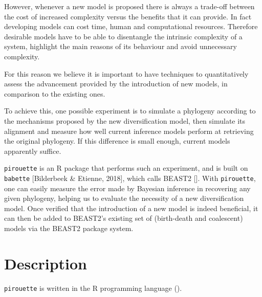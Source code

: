 \documentclass{article}
\begin{document}
However, whenever a new model is proposed there is always a trade-off 
between the cost of increased complexity versus the benefits that it can provide.
In fact developing models can cost time, human and computational resources.
Therefore desirable models have to be able to disentangle 
the intrinsic complexity of a system, 
highlight the main reasons of its behaviour and avoid unnecessary complexity. 

For this reason we believe it is important to have techniques 
to quantitatively assess the advancement provided by the introduction of new models, 
in comparison to the existing ones.

To achieve this, one possible experiment is to simulate a phylogeny 
according to the mechanisms proposed by the new diversification model, 
then simulate its alignment and measure how well current inference models perform 
at retrieving the original phylogeny.
If this difference is small enough, current models apparently
suffice.

\verb;pirouette; is an R package that performs such an experiment,
and is built on \verb;babette; [Bilderbeek \& Etienne, 2018], 
which calls BEAST2 [\cite{bouckaert2014beast}]. 
With \verb;pirouette;, one
can easily measure the error made by Bayesian inference in recovering
any given phylogeny, helping us to evaluate the necessity of a new diversification model.
Once verified that the introduction of a new model is indeed beneficial,
it can then be added to BEAST2's existing set of (birth-death and 
coalescent) models via the BEAST2 package system.

\section{Description}

\verb;pirouette; is written in the R programming language (\cite{R}).

\end{document}

